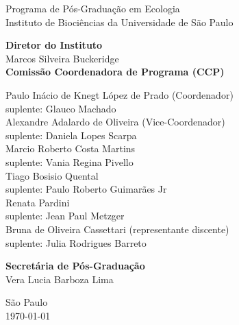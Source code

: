 {\LARGE Programa de Pós-Graduação em Ecologia \\[1ex]
  Instituto de Biociências da Universidade de São Paulo\\[1ex]
  }
\par
\vspace{0.01\paperheight}

{\Large 
  \textbf{Diretor do Instituto} \\[0.5em]
  Marcos Silveira Buckeridge\\
  \vspace{2em}
  \textbf{Comissão Coordenadora de Programa (CCP)} \\[0.5em]
  \begin{spacing}{1.2}
    Paulo Inácio de Knegt López de Prado (Coordenador)\\
    suplente: Glauco Machado \\ [0.75 em]
    Alexandre Adalardo de Oliveira (Vice-Coordenador)\\
    suplente: Daniela Lopes Scarpa \\ [0.75 em]
    Marcio Roberto Costa Martins\\
    suplente: Vania Regina Pivello \\ [0.75 em]
    Tiago Bosisio Quental\\
    suplente: Paulo Roberto Guimarães Jr\\ [0.75 em]
    Renata Pardini\\
    suplente:  Jean Paul Metzger  \\ [0.75 em]
    Bruna de Oliveira Cassettari (representante discente)\\
    suplente:  Julia Rodrigues Barreto
  \end{spacing}
  \vspace{1.25em}
  \textbf{Secretária de Pós-Graduação}\\[0.5em]
  Vera Lucia Barboza Lima\\
}

\vfill

{\Large São Paulo\\
\today}

